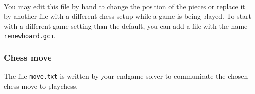 \documentclass[10pt]{scrartcl}
\begin{document}
\paragraph{}
You may edit this file by hand to change the position of the pieces or
replace it by another file with a different chess setup while a game is
being played. To start with a different game setting than the default,
you can add a file with the name \verb|renewboard.gch|. 
\begin{comment}
This file will
be loaded by playchess when a reset board command is send by hitting
``r''.
In \verb|/opt/prac/robotics/software4students/pl/boards| a few board settings are given on
which your implementation can be tested. These allow you to quickly and easily test your program
on a couple of different situations, but they are not cover every possible situation that your program
should be able to solve. So come up with some configurations yourself and try to find one where your
implementation performs poorly (e.g. it gets stuck in a loop or takes a lot more moves to reach
check mate than necessary).
\end{comment}

\subsubsection{Chess move}
The file \verb|move.txt| is written by your endgame solver to
communicate the chosen chess move to {\ttfamily playchess}.

\begin{comment}
\subsubsection{Forcing tree}
The file \verb|forcingTree.pl| is also written by the Prolog endgame
solver (see section \ref{sec:Endgames} of this manual). It is used to store the forcing tree, for the next move (the
endgame solver is called for each chess move separately). You could also
change it while playing a game for debugging purposes.

\subsubsection{Cartesian path representation}
The Java path plan algorithm produces a list of Cartesian positions of
the robot gripper and puts these in the file \verb|positions.txt|. For
example: 
\begin{verbatim}
124.279671 313.029663 37.500000 4.188790 30.000000
124.279671 313.029663 37.500000 4.188790 0.000000
124.279671 313.029663 218.000000 4.188790 0.000000
13.937696 427.147583 218.000000 4.188790 0.000000
13.937696 427.147583 58.000000 4.188790 0.000000
\end{verbatim}
On each line a different gripper position is described using the
$x$-, $y$-, $z$-coordinate of the tip of the gripper, the roll of the
gripper and the angle between the two gripper elements respectively.
\end{comment}
\end{document}
